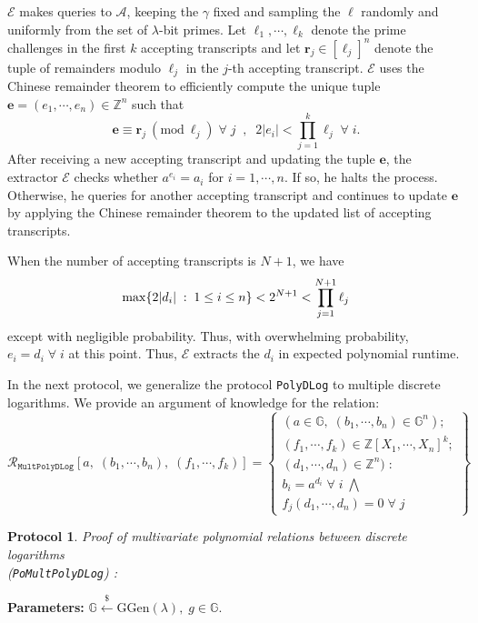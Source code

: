 \documentclass[11pt, lettersize, notitlepage, leqno, footskip=0.6cm]{article}
\newcommand{\bz}{\mathbb Z}
\newcommand{\pl}{\prod\limits}
\newcommand{\ttt}{\texttt}
\newcommand{\mc}{\mathcal}
\newcommand{\mb}{\mathbb}
\newcommand{\mbf}{\mathbf}
\newcommand{\mr}{\mathrm}
\newcommand{\lam}{\lambda}
\newcommand{\lamb}{\lambda}
\newcommand{\A}{\mc{A}}
\newcommand{\vs}{\vspace{-0.15cm}}
\newcommand{\noin}{\noindent}
\newcommand{\op}{overwhelming probability}
\newcommand{\np}{negligible probability}
\newcommand{\Mod}[1]{\ (\mathrm{mod}\ #1)}
\newcommand{\E}{\mc{E}}
\newtheorem{Prot}[Thm]{Protocol}
\numberwithin{equation}{section}
\begin{document}
\begin{prf}
$\E$ makes queries to $\A$, keeping the $\gamma$ fixed and sampling the $\ell$ randomly and uniformly from the set of $\lam$-bit primes. Let $\ell_1,\cdots,\ell_{k}$ denote the prime challenges in the first $k$ accepting transcripts and let $\mbf{r}_j\in [\ell_j]^n$ denote the tuple of remainders modulo $\ell_j$ in the $j$-th accepting transcript. $\E$ uses the Chinese remainder theorem to efficiently compute the unique tuple $\mbf{e} = (e_1,\cdots,e_n)\in \bz^n$ such that \vs $$\mbf{e}\equiv \mbf{r}_j\Mod{\ell_j}\;\forall\; j\;\;,\;\;2|e_i|< \pl_{j=1}^{k} \ell_j\;\forall\; i.$$ After receiving a new accepting transcript and updating the tuple $\mbf{e}$, the extractor $\E$ checks whether $a^{e_i} = a_i$ for $i=1,\cdots,n$. If so, he halts the process. Otherwise, he queries for another accepting transcript and continues to update $\mbf{e}$ by applying the Chinese remainder theorem to the updated list of accepting transcripts.

When the number of accepting transcripts is $N+1$, we have \vs $$\max\{2|d_i|\;:\;1\leq i\leq n \} < 2^{N+1} < \pl_{j=1}^{N+1}\ell_j \vs $$ except with \np. Thus, with \op, $e_i = d_i\;\forall\;i$ at this point. Thus, $\E$ extracts the $d_i$ in expected polynomial runtime. \end{prf}

In the next protocol, we generalize the protocol \verb|PolyDLog| to multiple discrete logarithms. We provide an argument of knowledge for the relation: 
\[
  \mc{R}_{\ttt{MultPolyDLog}}[a,\; (b_1,\cdots, b_n),\; (f_1,\cdots,f_k)] = \left\{\begin{array}{l}
    (a\in\mb{G},\; (b_1,\cdots, b_n)\in\mb{G}^n);\\
    (f_1,\cdots,f_k)\in\bz[X_1,\cdots,X_n]^k;\\ 
    (d_1,\cdots,d_n)\in\bz^n)\;: \\
    b_i = a^{d_i}\;\forall\; i\;\bigwedge \;\\   f_j(d_1,\cdots,d_n) = 0\;\forall\; j 
  \end{array}\right\}
\] 


\begin{Prot} \normalfont \hypertarget{Mult} {\textit{Proof of multivariate polynomial relations between discrete logarithms}}\\ (\verb|PoMultPolyDLog|) :\end{Prot} \vspace{-0.3cm}

\noin \textbf{Parameters:} $\mb{G}\xleftarrow{\$} \mr{GGen}(\lamb), \; g\in \mb{G}$.
\end{document}
